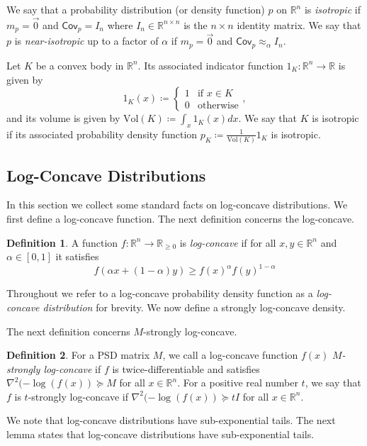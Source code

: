 \documentclass[11pt]{article}
\numberwithin{equation}{section}
\theoremstyle{definition}
\newtheorem{definition}[definition]{Definition}
\newcommand{\R}{\mathbb{R}}
\newcommand{\Vol}{\mathrm{Vol}}
\newcommand{\C}{\mathsf{Cov}}
\newcommand{\se}{\succeq}
\begin{document}
We say that a probability distribution (or density function) $p$ on
$\R^n$ is \emph{isotropic} if
$m_p = \vec{0}$ and
$\C_p = I_n$ where
$I_n \in \R^{n \times n}$ is the
$n \times n$ identity matrix.
We say that $p$ is \emph{near-isotropic} up to a factor of
$\alpha$ if
$m_p = \vec{0}$ and
$\C_p \approx_{\alpha} I_n$.

Let $K$ be a convex body in
$\R^n$.
Its associated indicator function $1_K: \R^n \to \R$ is given by
\[
1_K(x)
\coloneq
\begin{cases}
1 & \text{if $x \in K$}\\
0 & \text{otherwise}
\end{cases},
\]
and its volume is given by $\Vol(K) \coloneq \int_{x} 1_K(x) dx$.
We say that $K$ is isotropic if its associated probability density function
$p_K \coloneq \frac{1}{\Vol(K)} 1_K$ is isotropic.

\subsection{Log-Concave Distributions}\label{subsec:lc_dist}

In this section we collect some standard facts on log-concave distributions.
We first define a log-concave function.
The next definition concerns the log-concave.

\begin{definition}
A function $f: \R^n \rightarrow \R_{\ge0}$ is \emph{log-concave} if for all
$x,y \in \R^n$ and
$\alpha \in [0,1]$ it satisfies
\[
f(\alpha x + (1-\alpha)y) \geq f(x)^\alpha f(y)^{1-\alpha}
\]
\end{definition}
Throughout we refer to a log-concave probability density function as a
\emph{log-concave distribution} for brevity.
We now define a strongly log-concave density.

The next definition concerns $M$-strongly log-concave.

\begin{definition}
For a PSD matrix $M$, we call a log-concave function
$f(x)$
\emph{$M$-strongly log-concave} if
$f$ is twice-differentiable and satisfies
$\nabla^2(-\log(f(x))\se M$ for all
$x \in \R^n$.
For a positive real number $t$, we say that
$f$ is
$t$-strongly log-concave if
$\nabla^2(-\log(f(x)) \se tI$ for all
$x \in \R^n$.
\end{definition}

We note that log-concave distributions have sub-exponential tails.
The next lemma states that log-concave distributions have sub-exponential tails.
\end{document}
